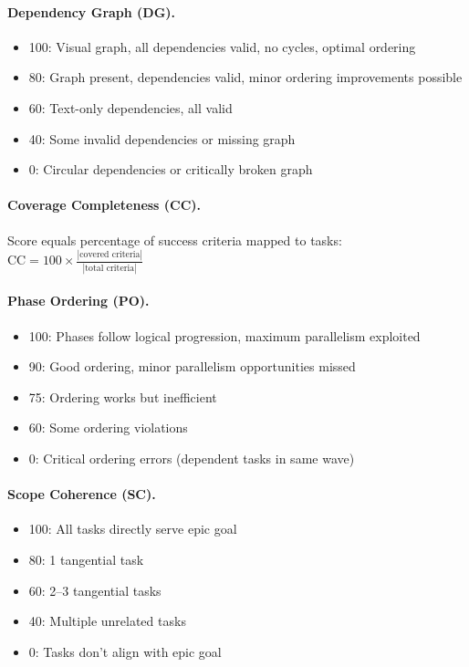 \paragraph{Dependency Graph (DG).}
\begin{itemize}
    \item 100: Visual graph, all dependencies valid, no cycles, optimal ordering
    \item 80: Graph present, dependencies valid, minor ordering improvements possible
    \item 60: Text-only dependencies, all valid
    \item 40: Some invalid dependencies or missing graph
    \item 0: Circular dependencies or critically broken graph
\end{itemize}

\paragraph{Coverage Completeness (CC).}
Score equals percentage of success criteria mapped to tasks:
$\text{CC} = 100 \times \frac{|\text{covered criteria}|}{|\text{total criteria}|}$

\paragraph{Phase Ordering (PO).}
\begin{itemize}
    \item 100: Phases follow logical progression, maximum parallelism exploited
    \item 90: Good ordering, minor parallelism opportunities missed
    \item 75: Ordering works but inefficient
    \item 60: Some ordering violations
    \item 0: Critical ordering errors (dependent tasks in same wave)
\end{itemize}

\paragraph{Scope Coherence (SC).}
\begin{itemize}
    \item 100: All tasks directly serve epic goal
    \item 80: 1 tangential task
    \item 60: 2--3 tangential tasks
    \item 40: Multiple unrelated tasks
    \item 0: Tasks don't align with epic goal
\end{itemize}

